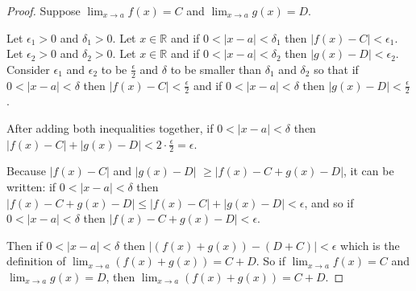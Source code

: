 \documentclass{article}
\begin{document}
    \begin{proof}
        Suppose $\lim_{x\rightarrow a} f(x) = C$ and $\lim_{x\rightarrow a} g(x) = D$.

        Let $\epsilon_1 >0$ and $\delta_1 >0$. Let $x\in\mathbb{R}$ and if $0<|x-a|<\delta_1$
        then $|f(x)-C|<\epsilon_1$. Let $\epsilon_2 >0$ and $\delta_2 >0$. Let $x\in\mathbb{R}$ 
        and if $0<|x-a|<\delta_2$ then $|g(x)-D|<\epsilon_2$. Consider $\epsilon_1$ and 
        $\epsilon_2$ to be $\frac{\epsilon}{2}$ and $\delta$ to be smaller than 
        $\delta_1$ and $\delta_2$ so that if $0<|x-a|<\delta$
        then $|f(x)-C|<\frac{\epsilon}{2}$ and if $0<|x-a|<\delta$ then 
        $|g(x)-D|<\frac{\epsilon}{2}$.

        After adding both inequalities together, if $0<|x-a|<\delta$ then 
        $|f(x)-C|+|g(x)-D|<2\cdot\frac{\epsilon}{2}=\epsilon$. 
        
        Because $|f(x)-C|$ and $|g(x)-D|$ $\geq |f(x)-C + g(x)-D|$, 
        it can be written: if $0<|x-a|<\delta$ then 
        $|f(x)-C + g(x)-D|\leq |f(x)-C|+|g(x)-D|<\epsilon$, and so
        if $0<|x-a|<\delta$ then $|f(x)-C + g(x)-D|<\epsilon$.

        Then if $0<|x-a|<\delta$ then $|(f(x) + g(x))-(D+C)|<\epsilon$ which is the 
        definition of $\lim_{x\rightarrow a} (f(x)+g(x)) = C+D$. So if 
        $\lim_{x\rightarrow a} f(x) = C$ and $\lim_{x\rightarrow a} g(x) = D$, then 
        $\lim_{x\rightarrow a}(f(x)+g(x)) = C+D$.
    \end{proof}

    
\end{document}
